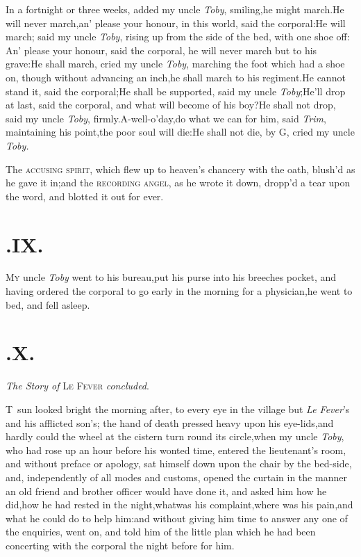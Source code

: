 \documentclass{article}
\begin{document}
\tsh In a fortnight or three weeks, added my uncle
\textit{Toby}, smiling,\tsh he might march.\tsh He
will never march,\pb an’ please your honour, in this world, said
the corporal:\tsh He will march; said my uncle
\textit{Toby}, rising up from the side of the bed, with one shoe
off:\tsh\break
An’ please your honour, said the corporal,
he will never march but to his grave:\tsh He shall march,
cried my uncle \textit{Toby}, marching the foot which had a shoe on,
though without advancing an inch,\tsk he shall march to his
regiment.\tsh He cannot stand it, said the
corporal;\tsh He shall be supported, said my uncle
\textit{Toby};\tsh He’ll drop at last, said the
corporal, and what will become of his boy?\tsh He shall
not drop, said my uncle \textit{Toby},
firmly.\tsh A-well-o’day,\break\tsk do what we can for
him, said \textit{Trim}, maintaining his point,\tsk the poor soul
will die:\tsh He shall not die, by G\tsk , cried my
uncle \textit{Toby.}

\newpage
\tsk The \textsc{accusing spirit}, which flew up to
heaven’s chancery with the oath, blush’d as he gave it
in;\tsk and the \textsc{recording angel}, as he wrote it
down, dropp’d a tear upon the word, and blotted it out for
ever.

\section{.\enspace IX.}

\lettrine{\Tsk M}{y} uncle \textit{Toby}
went to his bureau,\tsk put his purse into his breeches pocket,
and having ordered the corporal to go early in the morning for a
physician,\tsk he went to bed, and fell asleep.

\newpage
\null\par
\section{.\enspace X.}

\smallskip
\centerline{\textit{The Story of} \textsc{Le Fever} \textit{concluded}.}

\lettrine{T}{\,} sun looked bright the morning
after, to every eye in the village but \textit{Le Fever}’s and
his afflicted son’s; the hand of death pressed heavy upon his
eye-lids,\tsh and hardly could the wheel at the cistern
turn round its circle,\tsk when my uncle \textit{Toby}, who had
rose up an hour before his wonted time, entered the
lieutenant’s room, and without preface or apology, sat
himself down upon the chair by the bed-side, and, independently of
all modes and customs, opened the curtain in the manner an old
friend and brother officer would have done it, and asked him how he
did,\tsk how he had rested in the night,\tsk what\pb was his
complaint,\tsk where was his pain,\tsk and what he could do to
help him:\tsh and without giving him time to answer any
one of the enquiries, went on, and told him of the little plan
which he had been concerting with the corporal the night
before for him.\tsh
\end{document}
